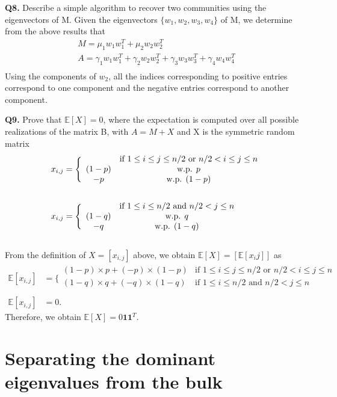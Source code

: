 \documentclass[9pt]{article}
\def\E{\mathbb{E}} %
\def\i{\mathbf{1}} %
\begin{document}
\textbf{Q8. } Describe a simple algorithm to recover two communities using the eigenvectors of M.
Given the eigenvectors $\{w_1, w_2, w_3, w_4\}$ of M, we determine from the above results that
\begin{align*}
M = \mu_1 w_1 w_1^T + \mu_2 w_2 w_2^T \\
A = \gamma_1 w_1 w_1^T + \gamma_2 w_2 w_2^T + \gamma_3 w_3 w_3^T + \gamma_4 w_4 w_4^T\\
\end{align*}
Using the components of $w_2$, all the indices corresponding to positive entries correspond to one component and the negative entries correspond to another component. 

\textbf{Q9. } Prove that $\E{[X]}=0$, where the expectation is computed over all possible realizations of the matrix B, with $A = M + X$ and X is the symmetric random matrix 
\begin{align}
x_{i,j} &= \Bigg\lbrace \begin{array}{cc}
&\text{if } 1\leq i\leq j\leq n/2 \text{ or } n/2 < i\leq j \leq n\\
(1-p) & \text{w.p. } p\\
-p & \text{w.p. } (1-p)
\end{array}\\ \notag\\
x_{i,j} &= \Bigg\lbrace \begin{array}{cc}
&\text{if } 1 \leq i\leq n/2 \text{ and } n/2 < j \leq n\\
(1-q) & \text{w.p. } q\\
-q & \text{w.p. } (1-q)
\end{array}
\end{align}\\

From the definition of $X = [x_{i,j}]$ above, we obtain $\E{[X]} = [\E{[x_ij]}]$ as
\begin{align*}
\E{[x_{i,j}]} &= \Bigg\lbrace \begin{array}{cc}
(1-p) \times p + (-p) \times (1-p) & \text{if } 1\leq i\leq j\leq n/2 \text{ or } n/2 < i\leq j \leq n\\
(1-q) \times q + (-q) \times (1-q) & \text{if } 1 \leq i\leq n/2 \text{ and } n/2 < j \leq n\\
\end{array}\\
\E{[x_{i,j}]} &= 0.
\end{align*}
Therefore, we obtain $\E{[X]} = 0 \i \i^T$.

\section{Separating the dominant eigenvalues from the bulk}
\end{document}
